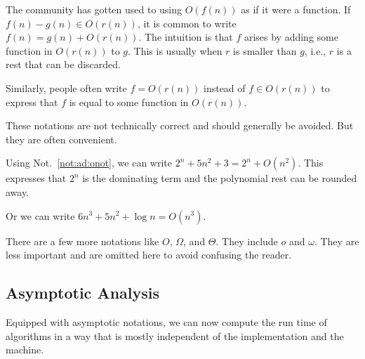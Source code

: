 
\begin{notation}\label{not:ad:onot}
The community has gotten used to using $O(f(n))$ as if it were a function.
If $f(n)-g(n)\in O(r(n))$, it is common to write $f(n)=g(n)+O(r(n))$.
The intuition is that $f$ arises by adding some function in $O(r(n))$ to $g$.
This is usually when $r$ is smaller than $g$, i.e., $r$ is a rest that can be discarded.

Similarly, people often write $f=O(r(n))$ instead of $f\in O(r(n))$ to express that $f$ is equal to some function in $O(r(n))$.
\medskip

These notations are not technically correct and should generally be avoided.
But they are often convenient.
\end{notation}

\begin{example}\label{ex:ad:onot2}
Using Not.~\ref{not:ad:onot}, we can write
 $2^n+5n^2+3=2^n+O(n^2)$.
This expresses that $2^n$ is the dominating term and the polynomial rest can be rounded away.

Or we can write $6n^3+5n^2+\log n=O(n^3)$.
\end{example}

\begin{remark}
There are a few more notations like $O$, $\Omega$, and $\Theta$.
They include $o$ and $\omega$.
They are less important and are omitted here to avoid confusing the reader.
\end{remark}

\subsection{Asymptotic Analysis}\label{sec:ad:asympana}

Equipped with asymptotic notations, we can now compute the run time of algorithms in a way that is mostly independent of the implementation and the machine.

